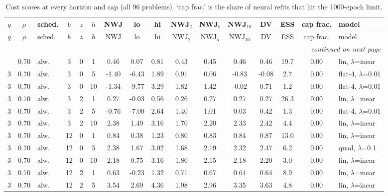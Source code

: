\begin{scriptsize}
\setlength{\tabcolsep}{3pt}
\begin{longtable}{cclcc c ccc ccc c cc l}
\caption{Cost scores at every horizon and cap (all 96 problems). `cap frac.' is the share of neural refits that hit the 1000-epoch limit.}\label{tab:app-cost}\\
\toprule
$q$ & $\rho$ & sched. & $b$ & $z$ & $h$ & NWJ & lo & hi & NWJ$_2$ & NWJ$_5$ & NWJ$_{10}$ & DV & ESS & cap frac. & model \\
\midrule
\endfirsthead
\toprule
$q$ & $\rho$ & sched. & $b$ & $z$ & $h$ & NWJ & lo & hi & NWJ$_2$ & NWJ$_5$ & NWJ$_{10}$ & DV & ESS & cap frac. & model \\
\midrule
\endhead
\midrule
\multicolumn{16}{r}{\emph{continued on next page}}\\
\endfoot
\bottomrule
\endlastfoot
3 & 0.70 & alw. & 3 & 0 & 1 & 0.46 & 0.07 & 0.81 & 0.43 & 0.45 & 0.46 & 0.46 & 19.7 & 0.00 & lin, $\lambda$=inear \\
3 & 0.70 & alw. & 3 & 0 & 5 & -1.40 & -6.43 & 1.89 & 0.91 & 0.06 & -0.83 & -0.08 & 2.7 & 0.00 & flat-4, $\lambda$=0.01 \\
3 & 0.70 & alw. & 3 & 0 & 10 & -1.34 & -9.77 & 3.29 & 1.82 & 1.42 & -0.02 & 0.71 & 1.2 & 0.00 & flat-4, $\lambda$=0.01 \\
3 & 0.70 & alw. & 3 & 2 & 1 & 0.27 & -0.03 & 0.56 & 0.26 & 0.27 & 0.27 & 0.27 & 26.3 & 0.00 & lin, $\lambda$=inear \\
3 & 0.70 & alw. & 3 & 2 & 5 & -0.76 & -7.00 & 2.64 & 1.40 & 1.01 & 0.03 & 0.42 & 1.3 & 0.00 & flat-4, $\lambda$=0.01 \\
3 & 0.70 & alw. & 3 & 2 & 10 & 2.38 & 1.49 & 3.16 & 1.70 & 2.20 & 2.33 & 2.42 & 4.4 & 0.00 & lin, $\lambda$=inear \\
3 & 0.70 & alw. & 12 & 0 & 1 & 0.84 & 0.38 & 1.23 & 0.80 & 0.83 & 0.84 & 0.87 & 13.0 & 0.00 & lin, $\lambda$=inear \\
3 & 0.70 & alw. & 12 & 0 & 5 & 2.38 & 1.67 & 3.02 & 1.68 & 2.19 & 2.32 & 2.47 & 6.2 & 0.00 & quad, $\lambda$=0.1 \\
3 & 0.70 & alw. & 12 & 0 & 10 & 2.18 & 0.75 & 3.16 & 1.80 & 2.15 & 2.18 & 2.20 & 3.0 & 0.00 & lin, $\lambda$=inear \\
3 & 0.70 & alw. & 12 & 2 & 1 & 0.63 & -0.23 & 1.32 & 0.71 & 0.67 & 0.64 & 0.64 & 8.9 & 0.00 & lin, $\lambda$=inear \\
3 & 0.70 & alw. & 12 & 2 & 5 & 3.54 & 2.69 & 4.36 & 1.98 & 2.96 & 3.35 & 3.63 & 4.8 & 0.00 & lin, $\lambda$=inear \\

\end{longtable}
\end{scriptsize}
